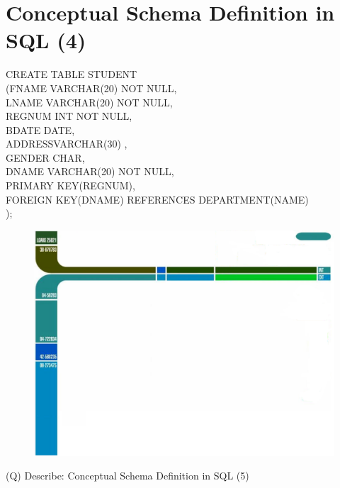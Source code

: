 \documentclass[12pt]{article}
\begin{document}
\section{Conceptual Schema Definition in SQL (4)}
CREATE TABLE STUDENT\\
(FNAME VARCHAR(20) NOT NULL,\\
LNAME VARCHAR(20) NOT NULL,\\
REGNUM   INT NOT NULL,\\
BDATE DATE,\\
ADDRESSVARCHAR(30) ,\\
GENDER CHAR,\\
DNAME VARCHAR(20) NOT NULL,\\
PRIMARY KEY(REGNUM),\\
FOREIGN KEY(DNAME) REFERENCES DEPARTMENT(NAME)\\
);\\
\begin{figure}[H]
\includegraphics[width=0.5\linewidth]{page8-image-1.png}
\end{figure}
\clearpage
(Q)
Describe: Conceptual Schema Definition in SQL (5)
\\ 
 \\
\end{document}
